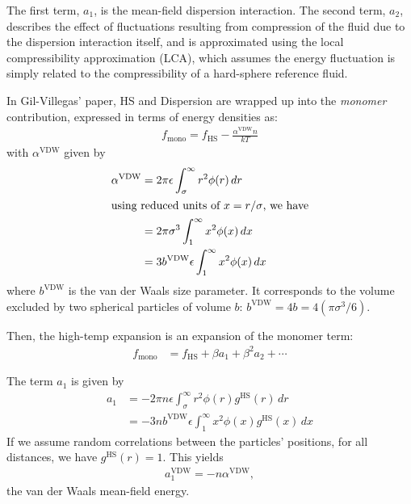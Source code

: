 \documentclass[letterpaper,twocolumn,amsmath,amssymb,prb]{revtex4-1}
\newcommand{\1}{\ensuremath{\textbf{r}_1}}
\newcommand{\2}{\ensuremath{\textbf{r}_2}}
\begin{document}
The first term, $a_1$, is the mean-field dispersion interaction. The second term, $a_2$, describes the effect of fluctuations resulting from compression of the fluid due to the dispersion interaction itself, and is approximated using the local compressibility approximation (LCA), which assumes the energy fluctuation is simply related to the compressibility of a hard-sphere reference fluid.\cite{Barker76}

In Gil-Villegas' paper, HS and Dispersion are wrapped up into the
\textit{monomer} contribution, expressed in terms of energy densities
as:
\begin{align}
  f_\text{mono} = f_\text{HS} - \frac{\alpha^\text{VDW}n}{kT}
\end{align}
with $\alpha^\text{VDW}$ given by
\begin{align}
  \alpha^\text{VDW} &= 2\pi\epsilon\int_\sigma^\infty r^2\phi(r)\,dr \\
  \intertext{using reduced units of $x = r/\sigma$, we have}
  &= 2\pi\sigma^3\int_1^\infty x^2\phi(x)\,dx \\
  &= 3b^\text{VDW}\epsilon\int_1^\infty x^2\phi(x)\,dx
\end{align}
where $b^\text{VDW}$ is the van der Waals size parameter. It corresponds to the volume excluded by two spherical particles of volume $b$: $b^\text{VDW} = 4b = 4\left(\pi\sigma^3/6\right)$.

Then, the high-temp expansion is an expansion of the monomer term:
\begin{align}
  f_\text{mono} &= f_\text{HS} + \beta a_1 + \beta^2 a_2 + \cdots
\end{align}

The term $a_1$ is given by
\begin{align}
  a_1 &= -2\pi n \epsilon\int_\sigma^\infty r^2\phi(r)g^\text{HS}(r)\,dr \\
  &= -3 n  b^\text{VDW}\epsilon\int_1^\infty x^2\phi(x)g^\text{HS}(x)\,dx
\end{align}
If we assume random correlations between the particles' positions, for all distances, we have $g^\text{HS}(r) = 1$. This yields
\begin{align}
  a_1^\text{VDW} = - n \alpha^\text{VDW},
\end{align}
the van der Waals mean-field energy.
\end{document}
